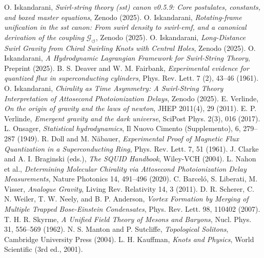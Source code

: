 \documentclass[10pt,reprint,aps,onecolumn,nofootinbib]{revtex4-2}
\begin{document}
    \begin{thebibliography}{99}
     O. Iskandarani, \emph{Swirl-string theory (sst) canon v0.5.9: Core postulates, constants, and boxed master equations}, Zenodo (2025).
     O. Iskandarani, \emph{Rotating-frame unification in the sst canon: From swirl density to swirl-emf, and a canonical derivation of the coupling $\mathcal{G}_{\circlearrowleft}$}, Zenodo (2025).
     O. Iskandarani, \emph{Long-Distance Swirl Gravity from Chiral Swirling Knots with Central Holes}, Zenodo (2025).
     O. Iskandarani, \emph{A Hydrodynamic Lagrangian Framework for Swirl-String Theory}, Preprint (2025).
     B. S. Deaver and W. M. Fairbank, \emph{Experimental evidence for quantized flux in superconducting cylinders}, Phys. Rev. Lett. 7 (2), 43--46 (1961).
     O. Iskandarani, \emph{Chirality as Time Asymmetry: A Swirl-String Theory Interpretation of Attosecond Photoionization Delays}, Zenodo (2025).
     E. Verlinde, \emph{On the origin of gravity and the laws of newton}, JHEP 2011(4), 29 (2011).
     E. P. Verlinde, \emph{Emergent gravity and the dark universe}, SciPost Phys. 2(3), 016 (2017).
     L. Onsager, \emph{Statistical hydrodynamics}, Il Nuovo Cimento (Supplemento), 6, 279--287 (1949).
     R. Doll and M. Näbauer, \emph{Experimental Proof of Magnetic Flux Quantization in a Superconducting Ring}, Phys. Rev. Lett. 7, 51 (1961).
     J. Clarke and A. I. Braginski (eds.), \emph{The SQUID Handbook}, Wiley-VCH (2004).
     L. Nahon et al., \emph{Determining Molecular Chirality via Attosecond Photoionization Delay Measurements}, Nature Photonics 14, 491–496 (2020).
     C. Barceló, S. Liberati, M. Visser, \emph{Analogue Gravity}, Living Rev. Relativity 14, 3 (2011).
     D. R. Scherer, C. N. Weiler, T. W. Neely, and B. P. Anderson, \emph{Vortex Formation by Merging of Multiple Trapped Bose-Einstein Condensates}, Phys. Rev. Lett. 98, 110402 (2007).
     T. H. R. Skyrme, \emph{A Unified Field Theory of Mesons and Baryons}, Nucl. Phys. 31, 556–569 (1962).
     N. S. Manton and P. Sutcliffe, \emph{Topological Solitons}, Cambridge University Press (2004).
     L. H. Kauffman, \emph{Knots and Physics}, World Scientific (3rd ed., 2001).

\end{thebibliography}
\end{document}
